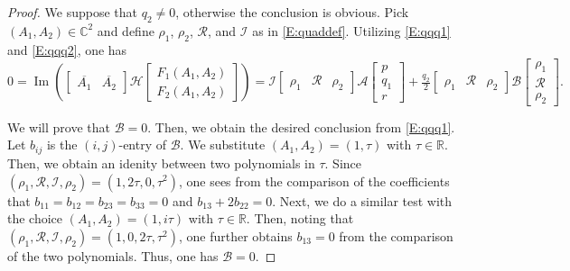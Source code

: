 \documentclass[11pt,a4paper,oneside]{amsart}
\theoremstyle{plain}
\theoremstyle{remark}
\numberwithin{equation}{section}
\newcommand{\C}{\mathbb{C}}
\newcommand{\R}{\mathbb{R}}
\renewcommand{\Im}{\operatorname{Im}}
\def\({\left(}
\def\){\right)}
\theoremstyle{definition}
\begin{document}
\begin{proof}
We suppose that $q_2\neq0$, otherwise the conclusion is obvious.
Pick $(A_1,A_2) \in \C^2$ and define $\rho_1$, $\rho_2$, $\mathcal{R}$, and $\mathcal{I}$ as in \eqref{E:quaddef}.
Utilizing \eqref{E:qqq1} and \eqref{E:qqq2}, one has
\[
	0=	\Im \(\begin{bmatrix} 
	\overline{A_1} & \overline{A_2} 
	\end{bmatrix}
	\mathscr{H}
	\begin{bmatrix}
	F_1 (A_1,A_2) \\
	F_2 (A_1,A_2)
	\end{bmatrix}
	\)
	= \mathcal{I} \begin{bmatrix} \rho_1 & \mathcal{R} & \rho_2  \end{bmatrix}
	\mathscr{A} \begin{bmatrix} p \\ q_1 \\ r \end{bmatrix}
	+\tfrac{q_2}2 \begin{bmatrix} \rho_1 & \mathcal{R} & \rho_2  \end{bmatrix} 
\mathscr{B}
\begin{bmatrix} \rho_1 \\ \mathcal{R} \\ \rho_2  \end{bmatrix}.
\]

We will prove that $\mathscr{B}=0$. Then, we obtain the desired conclusion from \eqref{E:qqq1}.
Let $b_{ij}$ is the $(i,j)$-entry of $\mathscr{B}$.
We substitute $(A_1,A_2)=(1,\tau)$ with $\tau\in \R$. Then, we obtain an idenity between two polynomials in $\tau$.
Since
$(\rho_1,\mathcal{R},\mathcal{I},\rho_2)=(1,2\tau,0,\tau^2)$, one sees  from the comparison of the coefficients that $b_{11} = b_{12}  = b_{23} = b_{33}=0$
and $b_{13} + 2b_{22} =0$.
Next, we do a similar test with the choice
$(A_1,A_2)=(1,i\tau)$ with $\tau\in \R$.
Then, noting that $(\rho_1,\mathcal{R},\mathcal{I},\rho_2)=(1,0,2\tau,\tau^2)$, one further obtains $b_{13}=0$ from the comparison of the two polynomials. Thus, one has $\mathscr{B}=0$.
\end{proof}
\end{document}
